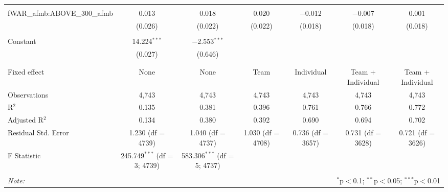 \begin{table}[!htbp]
\begin{tabular}{@{\extracolsep{5pt}}lcccccc}
  & & & & & & \\
 fWAR\_afmb:ABOVE\_300\_afmb & 0.013 & 0.018 & 0.020 & $-$0.012 & $-$0.007 & 0.001 \\
  & (0.026) & (0.022) & (0.022) & (0.018) & (0.018) & (0.018) \\
  & & & & & & \\
 Constant & 14.224$^{***}$ & $-$2.553$^{***}$ &  &  &  &  \\
  & (0.027) & (0.646) &  &  &  &  \\
  & & & & & & \\
\hline \\[-1.8ex]
Fixed effect & None & None & Team & Individual & Team + Individual & Team + Individual \\
Observations & 4,743 & 4,743 & 4,743 & 4,743 & 4,743 & 4,743 \\
R$^{2}$ & 0.135 & 0.381 & 0.396 & 0.761 & 0.766 & 0.772 \\
Adjusted R$^{2}$ & 0.134 & 0.380 & 0.392 & 0.690 & 0.694 & 0.702 \\
Residual Std. Error & 1.230 (df = 4739) & 1.040 (df = 4737) & 1.030 (df = 4708) & 0.736 (df = 3657) & 0.731 (df = 3628) & 0.721 (df = 3626) \\
F Statistic & 245.749$^{***}$ (df = 3; 4739) & 583.306$^{***}$ (df = 5; 4737) &  &  &  &  \\
\hline
\hline \\[-1.8ex]
\textit{Note:}  & \multicolumn{6}{r}{$^{*}$p$<$0.1; $^{**}$p$<$0.05; $^{***}$p$<$0.01} \\
\end{tabular}
\end{table}
